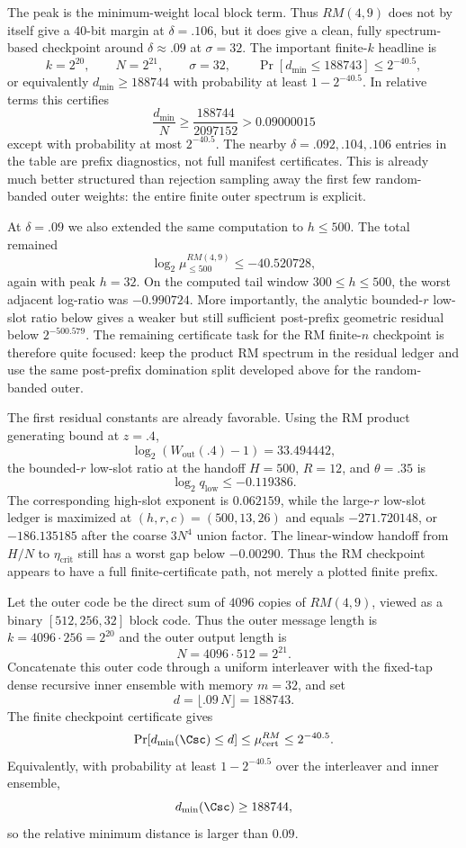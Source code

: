 The peak is the minimum-weight local block term.  Thus \(RM(4,9)\) does not by itself give a \(40\)-bit margin at
\(\delta=.106\), but it does give a clean, fully spectrum-based checkpoint around \(\delta\approx .09\) at
\(\sigma=32\).  The important finite-\(k\) headline is
\[
k=2^{20},\qquad N=2^{21},\qquad \sigma=32,\qquad
\Pr[d_{\min}\le188743]\le2^{-40.5},
\]
or equivalently \(d_{\min}\ge188744\) with probability at least \(1-2^{-40.5}\).  In relative terms this certifies
\[
\frac{d_{\min}}{N}\ge\frac{188744}{2097152}>0.09000015
\]
except with probability at most \(2^{-40.5}\).  The nearby \(\delta=.092,.104,.106\) entries in the table are prefix
diagnostics, not full manifest certificates.  This is already much better structured than rejection sampling away the
first few random-banded outer weights: the entire finite outer spectrum is explicit.

At \(\delta=.09\) we also extended the same computation to \(h\le500\).  The total remained
\[
\log_2\mu_{\le500}^{RM(4,9)}\le -40.520728,
\]
again with peak \(h=32\).  On the computed tail window \(300\le h\le500\), the worst adjacent log-ratio was
\(-0.990724\).  More importantly, the analytic bounded-\(r\) low-slot ratio below gives a weaker but still sufficient
post-prefix geometric residual below \(2^{-500.579}\).  The remaining certificate task for the RM finite-\(n\)
checkpoint is therefore quite focused: keep the product RM spectrum in the residual ledger and use the same
post-prefix domination split developed above for the random-banded outer.

The first residual constants are already favorable.  Using the RM product generating bound at \(z=.4\),
\[
\log_2(W_{\mathrm{out}}(.4)-1)=33.494442,
\]
the bounded-\(r\) low-slot ratio at the handoff \(H=500\), \(R=12\), and \(\theta=.35\) is
\[
\log_2 q_{\mathrm{low}}\le -0.119386.
\]
The corresponding high-slot exponent is \(0.062159\), while the large-\(r\) low-slot ledger is maximized at
\((h,r,c)=(500,13,26)\) and equals \(-271.720148\), or \(-186.135185\) after the coarse \(3N^4\) union factor.  The
linear-window handoff from \(H/N\) to \(\eta_{\mathrm{crit}}\) still has a worst gap below \(-0.00290\).  Thus the
RM checkpoint appears to have a full finite-certificate path, not merely a plotted finite prefix.

\begin{theorem}
\label{thm:finite-rm-block-checkpoint-009}
Let the outer code be the direct sum of \(4096\) copies of \(RM(4,9)\), viewed as a binary
\([512,256,32]\) block code.  Thus the outer message length is \(k=4096\cdot256=2^{20}\) and the
outer output length is
\[
N=4096\cdot512=2^{21}.
\]
Concatenate this outer code through a uniform interleaver with the fixed-tap dense recursive inner ensemble with
memory \(m=32\), and set
\[
d=\lfloor .09\,N\rfloor=188743.
\]
The finite checkpoint certificate gives
\[
\Pr[d_{\min}(\Csc)\le d]
\le
\mu_{\mathrm{cert}}^{RM}
\le
2^{-40.5}.
\]
Equivalently, with probability at least \(1-2^{-40.5}\) over the interleaver and inner ensemble,
\[
d_{\min}(\Csc)\ge188744,
\]
so the relative minimum distance is larger than \(0.09\).
\end{theorem}

